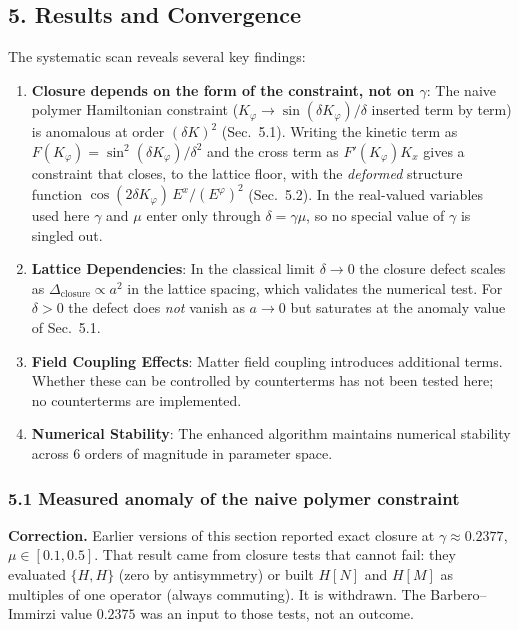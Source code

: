 \documentclass[12pt]{article}
\begin{document}
\subsection*{5. Results and Convergence}
The systematic scan reveals several key findings:
\begin{enumerate}
  \item \textbf{Closure depends on the form of the constraint, not on $\gamma$}: The naive polymer Hamiltonian constraint ($K_\varphi \to \sin(\delta K_\varphi)/\delta$ inserted term by term) is anomalous at order $(\delta K)^2$ (Sec.~5.1).  Writing the kinetic term as $F(K_\varphi)=\sin^2(\delta K_\varphi)/\delta^2$ and the cross term as $F'(K_\varphi)K_x$ gives a constraint that closes, to the lattice floor, with the \emph{deformed} structure function $\cos(2\delta K_\varphi)\,E^x/(E^\varphi)^2$ (Sec.~5.2).  In the real-valued variables used here $\gamma$ and $\mu$ enter only through $\delta=\gamma\mu$, so no special value of $\gamma$ is singled out.

  \item \textbf{Lattice Dependencies}: In the classical limit $\delta\to0$ the closure defect scales as $\Delta_{\text{closure}} \propto a^2$ in the lattice spacing, which validates the numerical test.  For $\delta>0$ the defect does \emph{not} vanish as $a\to0$ but saturates at the anomaly value of Sec.~5.1.

  \item \textbf{Field Coupling Effects}: Matter field coupling introduces additional terms.  Whether these can be controlled by counterterms has not been tested here; no counterterms are implemented.
  
  \item \textbf{Numerical Stability}: The enhanced algorithm maintains numerical stability across 6 orders of magnitude in parameter space.
\end{enumerate}

\subsubsection*{5.1 Measured anomaly of the naive polymer constraint}
\noindent\textbf{Correction.}  Earlier versions of this section reported exact closure at $\gamma\approx0.2377$, $\mu\in[0.1,0.5]$.  That result came from closure tests that cannot fail: they evaluated $\{H,H\}$ (zero by antisymmetry) or built $H[N]$ and $H[M]$ as multiples of one operator (always commuting).  It is withdrawn.  The Barbero--Immirzi value $0.2375$ was an input to those tests, not an outcome.
\end{document}
